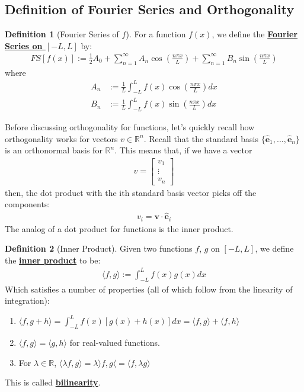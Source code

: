 \documentclass[11pt]{scrartcl}
\theoremstyle{definition}
\newtheorem{definition}{Definition}
\theoremstyle{remark}
\newcommand{\dfn}[1]{\textbf{\underline{#1}}}
\newcommand{\idx}[2]{\int_{#1}^{#2}}
\newcommand{\R}[0]{\mathbb{R}}
\begin{document}
\subsection{Definition of Fourier Series and Orthogonality}
\begin{definition}[Fourier Series of $f$]
	For a function $f(x)$, we define the \dfn{Fourier Series on $[-L, L]$} by: 
	\begin{align}
		FS[f(x)] := \frac{1}{2} A_0 + \sum_{n=1}^\infty A_n \cos \left (\frac{n \pi x}{L} \right) + \sum_{n=1}^\infty B_n \sin \left( \frac{n \pi x}{L} \right) 	
	\end{align}
	where
	\begin{align}
		A_n & := \frac{1}{L} \idx{-L}{L} f(x) \cos \left( \frac{n \pi x}{L} \right) dx \\
		B_n & := \frac{1}{L} \idx{-L}{L} f(x) \sin \left( \frac{n \pi x}{L} \right) dx 	
	\end{align}
\end{definition}
Before discussing orthogonality for functions, let's quickly recall how orthogonality works for vectors $v \in \R^n$. Recall that the standard basis $\{ \hat{\mathbf{e}}_1, ..., \hat{\mathbf{e}}_n \}$ is an orthonormal basis for $\mathbb{R}^n$. This means that, if we have a vector
\begin{align*}
	v = \begin{bmatrix}
		v_1 \\
		\vdots \\
		v_n
	\end{bmatrix}
\end{align*}
then, the dot product with the ith standard basis vector picks off the components: 
\begin{align*}
	v_i = \mathbf{v} \cdot \mathbf{\hat{e}}_i 
\end{align*}
The analog of a dot product for functions is the inner product. 
\begin{definition}[Inner Product]
	Given two functions $f$, $g$ on $[-L, L]$, we define the \dfn{inner product} to be: 
	\begin{align}
		\langle f, g \rangle := \idx{-L}{L} f(x) g(x) dx	
	\end{align}
	Which satisfies a number of properties (all of which follow from the linearity of integration):
	\begin{enumerate}[noitemsep]
		\item $\langle f, g+h \rangle = \idx{-L}{L} f(x) [ g(x) + h(x)] dx = \langle f, g \rangle + \langle f, h \rangle$
		\item $\langle f, g \rangle = \langle g, h \rangle $ for real-valued functions. 
		\item For $\lambda \in \R$, $\langle \lambda f, g \rangle = \lambda \rangle f, g \langle  = \langle f, \lambda g \rangle $
	\end{enumerate}
	This is called \dfn{bilinearity}. 
\end{definition}
\end{document}

